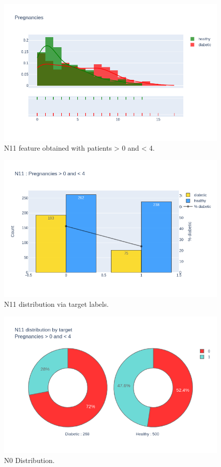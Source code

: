 \documentclass[12pt]{article}
\begin{document}
\begin{figure}[ht]
\centering
\includegraphics[width=1\textwidth]{newplot(36).png}
\caption{N11 feature obtained with patients > 0 and < 4.}
\end{figure}

\begin{figure}[ht]
\centering
\includegraphics[width=1\textwidth]{newplot(37).png}
\caption{N11 distribution via target labels.}
\end{figure}

\begin{figure}[ht]
\centering
\includegraphics[width=1\textwidth]{newplot(38).png}
\caption{N0 Distribution.}
\end{figure}
\end{document}
